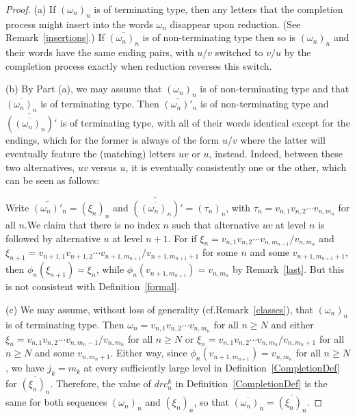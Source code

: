 \documentclass{amsart}
\theoremstyle{definition}
\theoremstyle{remark}
\numberwithin{equation}{section}
\begin{document}
\begin{proof} (a) If $(\omega_n)_n$ is of terminating type, then any letters that the completion process might insert into the words $\omega_n$   disappear upon reduction. (See Remark~\ref{insertions}.) If $\overline{(\omega_n)_n}$ is of non-terminating type then so is $(\omega_n)_n$ and their words have the same ending pairs, with $u/v$  switched to $v/u$ by the completion process exactly when reduction reverses this switch.

(b) By Part (a), we may assume that $(\omega_n)_n$ is of non-terminating type and that $\overline{(\omega_n)_n}$ is of terminating type.
Then $\overleftarrow{(\omega_n)'_n}$ is of non-terminating type and $\overleftarrow{\left(\overline{(\omega_n)_n}\right)'}$ is of terminating type, with all of their words identical except for the endings, which for the former is always of the form $u/v$ where the latter will eventually feature the (matching) letters $uv$ or $u$, instead. Indeed, between these two alternatives, $uv$ versus $u$, it is eventually consistently one or the other, which can be seen as follows:

Write $\overleftarrow{(\omega_n)'_n}=(\xi_n)_n$ and $\overleftarrow{\left(\overline{(\omega_n)_n}\right)'}=(\tau_n)_n$, with $\tau_n=v_{n,1}v_{n,2}\cdots v_{n,m_n}$ for all $n$.\linebreak We claim that there is no index $n$ such that alternative $uv$ at level $n$ is followed by alternative $u$ at level $n+1$.
For if  $\xi_n=v_{n,1}v_{n,2}\cdots v_{n,m_{n-1}}/v_{n,m_n}$ and $\xi_{n+1}=
v_{n+1,1}v_{n+1,2}\cdots v_{n+1,m_{n+1}}/v_{n+1,m_{n+1}+1}$ for some $n$ and some $v_{n+1,m_{n+1}+1}$,   then $\phi_n(\xi_{n+1})=\xi_n$, while $\phi_n(v_{n+1,m_{n+1}})=v_{n,m_n}$ by Remark~\ref{last}. But this is not consistent with Definition~\ref{formal}.

(c) We may assume, without loss of generality (cf.\@ Remark~\ref{classes}), that $(\omega_n)_n$ is of terminating type. Then $\omega_n=v_{n,1}v_{n,2}\cdots  v_{n,{m_n}}$ for all $n\geqslant N$ and either  $\xi_n=v_{n,1}v_{n,2}\cdots v_{n,{m_n-1}}/v_{n,{m_n}}$ for all $n\geqslant N$ or $\xi_n=v_{n,1}v_{n,2}\cdots v_{n,{m_n}}/v_{n,{m_n}+1}$  for all $n\geqslant N$ and some $v_{n,{m_n}+1}$.
Either way, since $\phi_n(v_{n+1,m_{n+1}})=v_{n,{m_n}}$ for all $n\geqslant N$, we have $j_k=m_k$ at every sufficiently large level in Definition~\ref{CompletionDef} for $\overline{(\xi_n)_n}$. Therefore, the value of $drc_n^k$ in Definition~\ref{CompletionDef} is the same for both sequences $(\omega_n)_n$ and $(\xi_n)_n$, so that $\overline{(\omega_n)_n}=\overline{(\xi_n)_n}$.
\end{proof}
\end{document}
